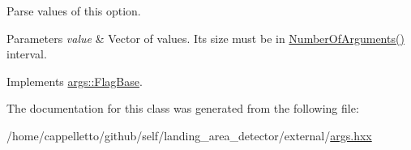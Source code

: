 Parse values of this option.


\begin{DoxyParams}{Parameters}
{\em value} & Vector of values. It\textquotesingle{}s size must be in \hyperlink{classargs_1_1_action_flag_aa341976acd895df15fb2bfe7182c48eb}{Number\+Of\+Arguments()} interval. \\
\hline
\end{DoxyParams}


Implements \hyperlink{classargs_1_1_flag_base_a3421d9a595c9426dc73f62604cdee84f}{args\+::\+Flag\+Base}.



The documentation for this class was generated from the following file\+:\begin{DoxyCompactItemize}
\item 
/home/cappelletto/github/self/landing\+\_\+area\+\_\+detector/external/\hyperlink{args_8hxx}{args.\+hxx}\end{DoxyCompactItemize}
